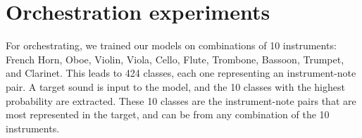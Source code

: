 \documentclass{article}
\begin{document}

\section{Orchestration experiments}

For orchestrating, we trained our models on combinations of 10 instruments: French Horn, Oboe, Violin, Viola, Cello, Flute, Trombone, Bassoon, Trumpet, and Clarinet. This leads to 424 classes, each one representing an instrument-note pair. A target sound is input to the model, and the 10 classes with the highest probability are extracted. These 10 classes are the instrument-note pairs that are most represented in the target, and can be from any combination of the 10 instruments. 
\end{document}

